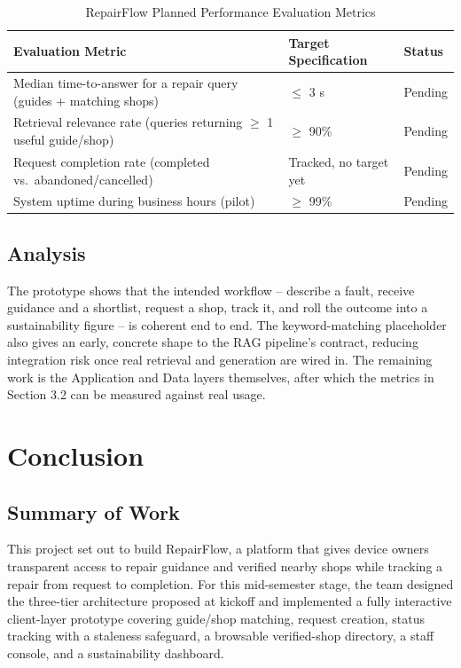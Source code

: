 \documentclass[11pt,a4paper]{report}
\begin{document}
\begin{table}[h!]
\centering
\small
\begin{tabular}{p{6.2cm}p{4cm}p{2.8cm}}
\toprule
\textbf{Evaluation Metric} & \textbf{Target Specification} & \textbf{Status} \\
\midrule
Median time-to-answer for a repair query (guides + matching shops) & $\leq$ 3 s & Pending \\
Retrieval relevance rate (queries returning $\geq$ 1 useful guide/shop) & $\geq$ 90\% & Pending \\
Request completion rate (completed vs.\ abandoned/cancelled) & Tracked, no target yet & Pending \\
System uptime during business hours (pilot) & $\geq$ 99\% & Pending \\
\bottomrule
\end{tabular}
\caption{RepairFlow Planned Performance Evaluation Metrics}
\end{table}

\section{Analysis}

The prototype shows that the intended workflow -- describe a fault, receive guidance and a shortlist, request a shop, track it, and roll the outcome into a sustainability figure -- is coherent end to end. The keyword-matching placeholder also gives an early, concrete shape to the RAG pipeline's contract, reducing integration risk once real retrieval and generation are wired in. The remaining work is the Application and Data layers themselves, after which the metrics in Section 3.2 can be measured against real usage.

\chapter{Conclusion}

\section{Summary of Work}

This project set out to build RepairFlow, a platform that gives device owners transparent access to repair guidance and verified nearby shops while tracking a repair from request to completion. For this mid-semester stage, the team designed the three-tier architecture proposed at kickoff and implemented a fully interactive client-layer prototype covering guide/shop matching, request creation, status tracking with a staleness safeguard, a browsable verified-shop directory, a staff console, and a sustainability dashboard.
\end{document}
